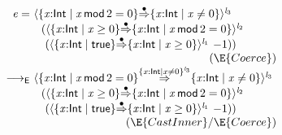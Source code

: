 \documentclass[9pt]{extarticle}
\newcommand{\ottnt}[1]{\mathit{#1}}
\newcommand{\ottsym}[1]{#1}
\begin{document}
\begin{figure}[t]
\[ \begin{array}{@{}r@{~}l}
  \ottnt{e} = &  \langle   \{ \mathit{x} \mathord{:}  \mathsf{Int}  \mathrel{\mid}  \mathit{x} \,  \mathsf{mod}  \, \ottsym{2}  \mathrel{=}  \ottsym{0}  \}   \mathord{ \overset{\bullet}{\Rightarrow} }   \{ \mathit{x} \mathord{:}  \mathsf{Int}  \mathrel{\mid}  \mathit{x}  \mathrel{\ne}  \ottsym{0}  \}   \rangle^{ \ottnt{l_{{\mathrm{3}}}} } ~  {} \\  &   ~~   (  \langle   \{ \mathit{x} \mathord{:}  \mathsf{Int}  \mathrel{\mid}  \mathit{x}  \mathrel{\ge}  \ottsym{0}  \}   \mathord{ \overset{\bullet}{\Rightarrow} }   \{ \mathit{x} \mathord{:}  \mathsf{Int}  \mathrel{\mid}  \mathit{x} \,  \mathsf{mod}  \, \ottsym{2}  \mathrel{=}  \ottsym{0}  \}   \rangle^{ \ottnt{l_{{\mathrm{2}}}} } ~  {} \\  &  \quad   (  \langle   \{ \mathit{x} \mathord{:}  \mathsf{Int}  \mathrel{\mid}  \mathsf{true}  \}   \mathord{ \overset{\bullet}{\Rightarrow} }   \{ \mathit{x} \mathord{:}  \mathsf{Int}  \mathrel{\mid}  \mathit{x}  \mathrel{\ge}  \ottsym{0}  \}   \rangle^{ \ottnt{l_{{\mathrm{1}}}} } ~   {-1}   )   )    \\
 \multicolumn{2}{r}{(\E{Coerce})} \\
  \longrightarrow _{  \mathsf{E}  }  &  \langle   \{ \mathit{x} \mathord{:}  \mathsf{Int}  \mathrel{\mid}  \mathit{x} \,  \mathsf{mod}  \, \ottsym{2}  \mathrel{=}  \ottsym{0}  \}   \mathord{ \overset{  \{ \mathit{x} \mathord{:}  \mathsf{Int}  \mathrel{\mid}  \mathit{x}  \mathrel{\ne}  \ottsym{0}  \}^{ \ottnt{l_{{\mathrm{3}}}} }  }{\Rightarrow} }   \{ \mathit{x} \mathord{:}  \mathsf{Int}  \mathrel{\mid}  \mathit{x}  \mathrel{\ne}  \ottsym{0}  \}   \rangle^{ \ottnt{l_{{\mathrm{3}}}} } ~  {} \\  &   ~~   (  \langle   \{ \mathit{x} \mathord{:}  \mathsf{Int}  \mathrel{\mid}  \mathit{x}  \mathrel{\ge}  \ottsym{0}  \}   \mathord{ \overset{\bullet}{\Rightarrow} }   \{ \mathit{x} \mathord{:}  \mathsf{Int}  \mathrel{\mid}  \mathit{x} \,  \mathsf{mod}  \, \ottsym{2}  \mathrel{=}  \ottsym{0}  \}   \rangle^{ \ottnt{l_{{\mathrm{2}}}} } ~  {} \\  &  \quad   (  \langle   \{ \mathit{x} \mathord{:}  \mathsf{Int}  \mathrel{\mid}  \mathsf{true}  \}   \mathord{ \overset{\bullet}{\Rightarrow} }   \{ \mathit{x} \mathord{:}  \mathsf{Int}  \mathrel{\mid}  \mathit{x}  \mathrel{\ge}  \ottsym{0}  \}   \rangle^{ \ottnt{l_{{\mathrm{1}}}} } ~   {-1}   )   )    \\
 \multicolumn{2}{r}{(\E{CastInner}/\E{Coerce})} \\ 

\end{array}\]
\end{figure}
\end{document}
